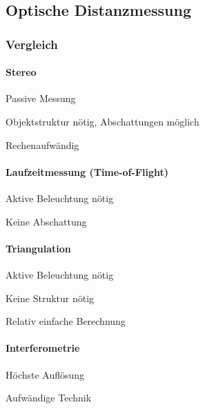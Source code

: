 \subsection{Optische Distanzmessung}
\subsubsection{Vergleich}
\begin{multicols}{4}
    \paragraph{Stereo}
    \begin{compactitem}
        \item Passive Messung
        \item Objektstruktur nötig, Abschattungen möglich
        \item Rechenaufwändig
    \end{compactitem}
    
    \paragraph{Laufzeitmessung (Time-of-Flight)}
    \begin{compactitem}
        \item Aktive Beleuchtung nötig
        \item Keine Abschattung
    \end{compactitem}
    
    \paragraph{Triangulation}
    \begin{compactitem}
        \item Aktive Beleuchtung nötig
        \item Keine Struktur nötig
        \item Relativ einfache Berechnung
    \end{compactitem}
    
    \paragraph{Interferometrie}
    \begin{compactitem}
        \item Höchste Auflösung
        \item Aufwändige Technik
    \end{compactitem}
\end{multicols}


